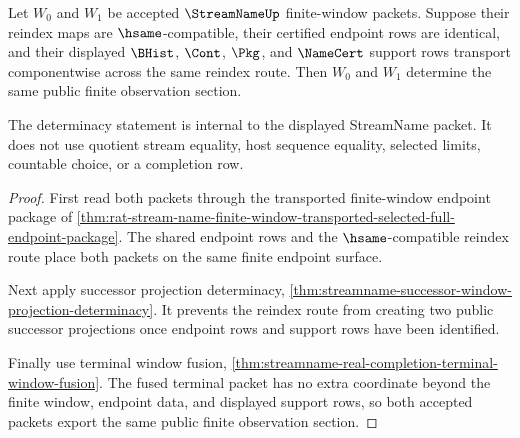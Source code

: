 \begin{theorem}
\label{thm:streamname-window-reindex-determinacy}
Let $W_0$ and $W_1$ be accepted $\StreamNameUp$ finite-window packets. Suppose their reindex maps are $\hsame$-compatible, their certified endpoint rows are identical, and their displayed $\BHist$, $\Cont$, $\Pkg$, and $\NameCert$ support rows transport componentwise across the same reindex route. Then $W_0$ and $W_1$ determine the same public finite observation section.

The determinacy statement is internal to the displayed StreamName packet. It does not use quotient stream equality, host sequence equality, selected limits, countable choice, or a completion row.
\end{theorem}
\begin{proof}
First read both packets through the transported finite-window endpoint package of \autoref{thm:rat-stream-name-finite-window-transported-selected-full-endpoint-package}. The shared endpoint rows and the $\hsame$-compatible reindex route place both packets on the same finite endpoint surface.

Next apply successor projection determinacy, \autoref{thm:streamname-successor-window-projection-determinacy}. It prevents the reindex route from creating two public successor projections once endpoint rows and support rows have been identified.

Finally use terminal window fusion, \autoref{thm:streamname-real-completion-terminal-window-fusion}. The fused terminal packet has no extra coordinate beyond the finite window, endpoint data, and displayed support rows, so both accepted packets export the same public finite observation section.
\end{proof}

